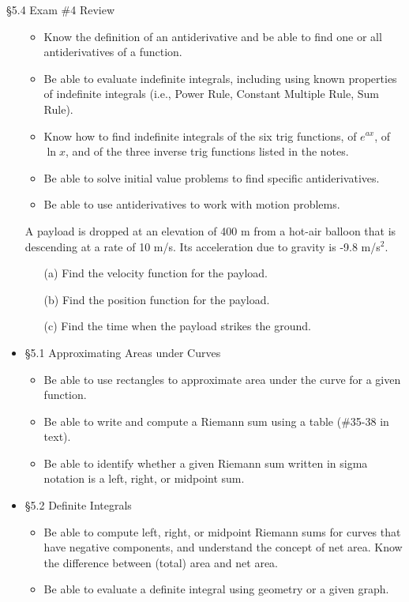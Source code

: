 \documentclass[cal1spr16Lectures.tex]{subfiles}
\begin{document}
\begin{frame}[allowframebreaks]{\S 5.4 Exam \#4 Review}
\begin{itemize}
\begin{itemize}
	\item Know the definition of an antiderivative and be able to find one or all antiderivatives of a function.
	\item Be able to evaluate indefinite integrals, including using known properties of indefinite integrals (i.e., Power Rule, Constant Multiple Rule, Sum Rule).
	\item Know how to find indefinite integrals of the six trig functions, of $e^{ax}$, of $\ln x$, and of the three inverse trig functions listed in the notes.
%
\framebreak
	\item Be able to solve initial value problems to find specific antiderivatives.
	\item Be able to use antiderivatives to work with motion problems.
	\end{itemize}
\begin{exe}
A payload is dropped at an elevation of 400 m from a hot-air balloon that is descending at a rate of 10 m/s.  Its acceleration due to gravity is -9.8 m/s$^{\text{2}}$.
\begin{itemize}
\item[(a)] Find the velocity function for the payload.
\item[(b)] Find the position function for the payload.
\item[(c)] Find the time when the payload strikes the ground.
\end{itemize}
\end{exe}	
%
\framebreak
\item \S 5.1 Approximating Areas under Curves
	\begin{itemize}\footnotesize
	\item Be able to use rectangles to approximate area under the curve for a given function.
	\item Be able to write and compute a Riemann sum using a table (\#35-38 in text).
	\item Be able to identify whether a given Riemann sum written in sigma notation is a left, right, or midpoint sum.
	\end{itemize}
%
\framebreak	
\item \S 5.2 Definite Integrals
	\begin{itemize}\footnotesize
	\item Be able to compute left, right, or midpoint Riemann sums for curves that have negative components, and understand the concept of net area.  Know the difference between (total) area and net area.
	\item Be able to evaluate a definite integral using geometry or a given graph.

\end{itemize}
\end{itemize}
\end{frame}
\end{document}
